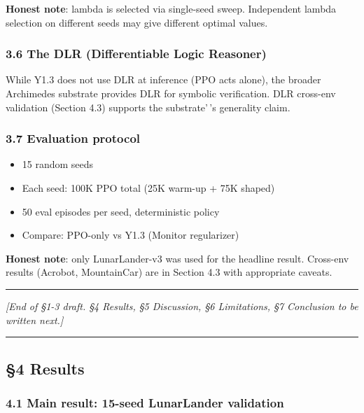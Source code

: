 \documentclass[
]{article}
\providecommand{\tightlist}{%
  \setlength{\itemsep}{0pt}\setlength{\parskip}{0pt}}
\begin{document}
\textbf{Honest note}: lambda is selected via single-seed sweep.
Independent lambda selection on different seeds may give different
optimal values.

\subsubsection{3.6 The DLR (Differentiable Logic
Reasoner)}\label{the-dlr-differentiable-logic-reasoner}

While Y1.3 does not use DLR at inference (PPO acts alone), the broader
Archimedes substrate provides DLR for symbolic verification. DLR
cross-env validation (Section 4.3) supports the substrate'\,'s
generality claim.

\subsubsection{3.7 Evaluation protocol}\label{evaluation-protocol}

\begin{itemize}
\tightlist
\item
  15 random seeds
\item
  Each seed: 100K PPO total (25K warm-up + 75K shaped)
\item
  50 eval episodes per seed, deterministic policy
\item
  Compare: PPO-only vs Y1.3 (Monitor regularizer)
\end{itemize}

\textbf{Honest note}: only LunarLander-v3 was used for the headline
result. Cross-env results (Acrobot, MountainCar) are in Section 4.3 with
appropriate caveats.

\begin{center}\rule{0.5\linewidth}{0.5pt}\end{center}

\emph{{[}End of §1-3 draft. §4 Results, §5 Discussion, §6 Limitations,
§7 Conclusion to be written next.{]}}

\begin{center}\rule{0.5\linewidth}{0.5pt}\end{center}

\subsection{§4 Results}\label{results}

\subsubsection{4.1 Main result: 15-seed LunarLander
validation}\label{main-result-15-seed-lunarlander-validation}
\end{document}
